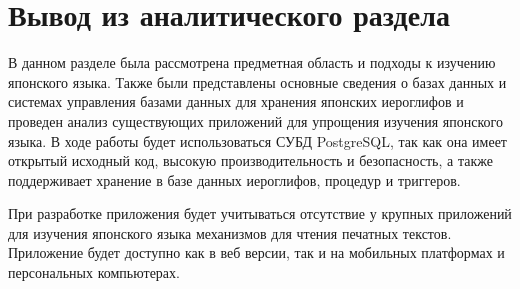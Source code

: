 \section*{Вывод из аналитического раздела}

В данном разделе была рассмотрена предметная область и подходы
к изучению японского языка. Также были представлены основные сведения
о базах данных и системах управления базами данных для хранения
японских иероглифов и проведен анализ существующих приложений
для упрощения изучения японского языка. В ходе работы будет использоваться СУБД PostgreSQL, так как она имеет открытый исходный код, высокую производительность и безопасность, а также поддерживает хранение в базе данных иероглифов, процедур и триггеров.

При разработке приложения будет учитываться отсутствие у крупных приложений для изучения японского языка механизмов для чтения печатных текстов. Приложение будет доступно как в веб версии, так и на мобильных платформах и персональных компьютерах.

